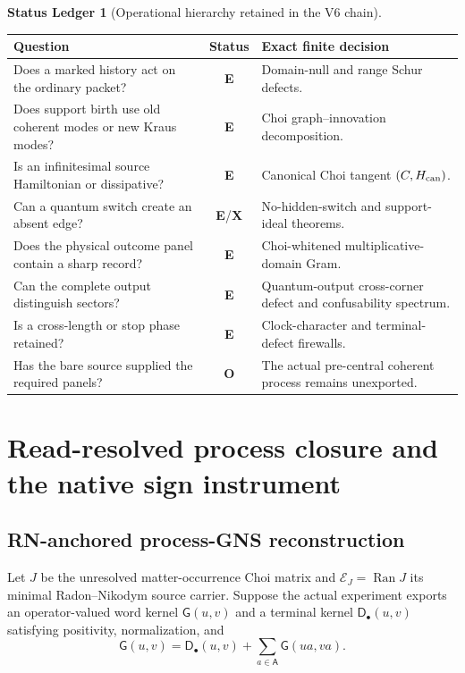 \documentclass[11pt,oneside,openany]{book}
\numberwithin{equation}{chapter}
\theoremstyle{definition}
\newtheorem{ledger}[theorem]{Status Ledger}
\theoremstyle{remark}
\newcommand{\Ran}{\operatorname{Ran}}
\newcommand{\statusE}{\textcolor{ExactColor}{\textbf{E}}}
\newcommand{\statusO}{\textcolor{OpenColor}{\textbf{O}}}
\newcommand{\statusX}{\textcolor{SuperColor}{\textbf{X}}}
\begin{document}
\begin{ledger}[Operational hierarchy retained in the V6 chain]
\label{led:v6-access-hierarchy}
\begin{center}
\begin{tabularx}{0.97\textwidth}{@{}p{}cX@{}}
\toprule
Question & Status & Exact finite decision\\
\midrule
Does a marked history act on the ordinary packet?
& \statusE & Domain-null and range Schur defects.\\
Does support birth use old coherent modes or new Kraus modes?
& \statusE & Choi graph--innovation decomposition.\\
Is an infinitesimal source Hamiltonian or dissipative?
& \statusE & Canonical Choi tangent \((C,H_{\rm can})\).\\
Can a quantum switch create an absent edge?
& \statusE/\statusX & No-hidden-switch and support-ideal theorems.\\
Does the physical outcome panel contain a sharp record?
& \statusE & Choi-whitened multiplicative-domain Gram.\\
Can the complete output distinguish sectors?
& \statusE & Quantum-output cross-corner defect and confusability spectrum.\\
Is a cross-length or stop phase retained?
& \statusE & Clock-character and terminal-defect firewalls.\\
Has the bare source supplied the required panels?
& \statusO & The actual pre-central coherent process remains unexported.\\
\bottomrule
\end{tabularx}
\end{center}
\end{ledger}

\chapter{Read-resolved process closure and the native sign instrument}
\label{ch:v6-process}

\section{RN-anchored process-GNS reconstruction}
Let \(J\) be the unresolved matter-occurrence Choi matrix and
\(\mathcal E_J=\Ran J\) its minimal Radon--Nikodym source carrier.  Suppose the
actual experiment exports an operator-valued word kernel \(\mathsf G(u,v)\) and a
terminal kernel \(\mathsf D_\bullet(u,v)\) satisfying positivity, normalization,
and
\[
 \mathsf G(u,v)=\mathsf D_\bullet(u,v)
 +\sum_{a\in\mathsf A}\mathsf G(ua,va).
\]
\end{document}
